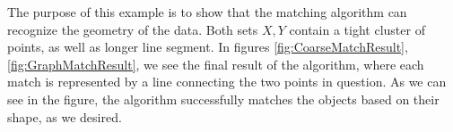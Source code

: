 \documentclass[journal]{IEEEtran}
\begin{document}
The purpose of this example is to show that the matching algorithm can recognize
the geometry of the data. Both sets $X,Y$ contain a tight cluster of points, as
well as longer line segment. In figures \ref{fig:CoarseMatchResult},
\ref{fig:GraphMatchResult}, we see the final result of the algorithm, where each
match is represented by a line connecting the two points in question. As we can
see in the figure, the algorithm successfully matches the objects based on their
shape, as we desired.

\begin{figure}
  \centering {}%
  \hfill%
\end{figure}
\end{document}

